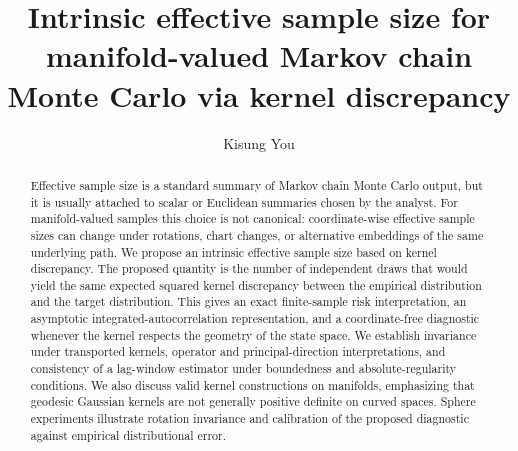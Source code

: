 \documentclass[11pt]{article}
\newcommand{\1}{\mathbf{1}}
\begin{document}
	
\title{Intrinsic effective sample size for manifold-valued Markov chain Monte Carlo via kernel discrepancy}
\author[1,2]{Kisung You}
\date{}

\maketitle
\begin{abstract}
Effective sample size is a standard summary of Markov chain Monte Carlo output, but it is usually attached to scalar or Euclidean summaries chosen by the analyst. For manifold-valued samples this choice is not canonical: coordinate-wise effective sample sizes can change under rotations, chart changes, or alternative embeddings of the same underlying path. We propose an intrinsic effective sample size based on kernel discrepancy. The proposed quantity is the number of independent draws that would yield the same expected squared kernel discrepancy between the empirical distribution and the target distribution. This gives an exact finite-sample risk interpretation, an asymptotic integrated-autocorrelation representation, and a coordinate-free diagnostic whenever the kernel respects the geometry of the state space. We establish invariance under transported kernels, operator and principal-direction interpretations, and consistency of a lag-window estimator under boundedness and absolute-regularity conditions. We also discuss valid kernel constructions on manifolds, emphasizing that geodesic Gaussian kernels are not generally positive definite on curved spaces. Sphere experiments illustrate rotation invariance and calibration of the proposed diagnostic against empirical distributional error.
\end{abstract}
\end{document}
